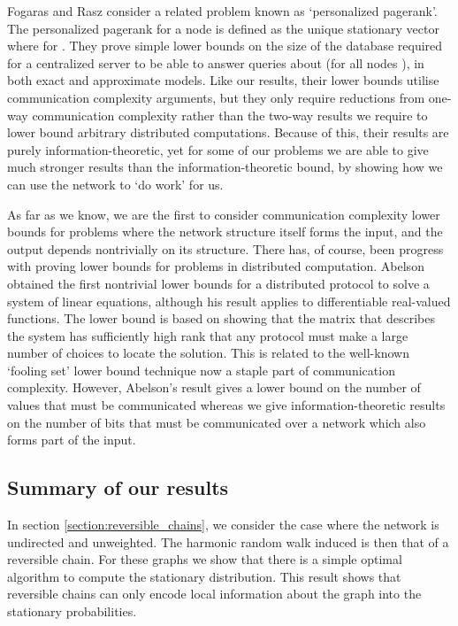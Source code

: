 \documentclass[twocolumn]{article}
\begin{document}
Fogaras and Rasz \cite{fogaras04} consider a related problem known as `personalized pagerank'. The personalized pagerank for a node  is defined as the unique stationary vector  where  for . They prove simple lower bounds on the size of the database required for a centralized server to be able to answer queries about  (for all nodes ), in both exact and approximate models. Like our results, their lower bounds utilise communication complexity arguments, but they only require reductions from one-way communication complexity rather than the two-way results we require to lower bound arbitrary distributed computations. Because of this, their results are purely information-theoretic, yet for some of our problems we are able to give much stronger results than the information-theoretic bound, by showing how we can use the network to `do work' for us.

As far as we know, we are the first to consider communication complexity lower bounds for problems where the network structure itself forms the input, and the output depends nontrivially on its structure. There has, of course, been progress with proving lower bounds for problems in distributed computation. Abelson \cite{322200} obtained the first nontrivial lower bounds for a distributed protocol to solve a system of linear equations, although his result applies to differentiable real-valued functions. The lower bound is based on showing that the matrix that describes the system has sufficiently high rank that any protocol must make a large number of choices to locate the solution. This is related to the well-known `fooling set' lower bound technique now a staple part of communication complexity. However, Abelson's result gives a lower bound on the number of values that must be communicated whereas we give information-theoretic results on the number of bits that must be communicated over a network which also forms part of the input.

\subsection{Summary of our results}

In section \ref{section:reversible_chains}, we consider the case where the network  is undirected and unweighted. The harmonic random walk induced is then that of a reversible chain. For these graphs we show that there is a simple optimal algorithm to
compute the stationary distribution. This result shows that reversible
chains can only encode local information about the graph into the
stationary probabilities.
\end{document}
